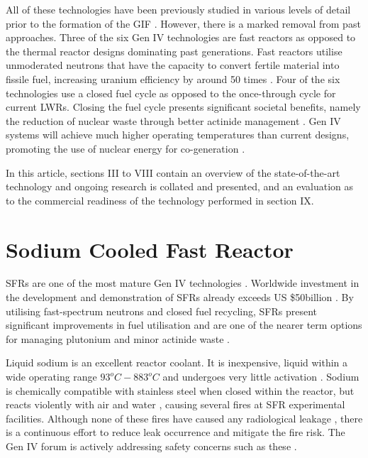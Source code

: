 \documentclass[journal]{IEEEtran}
\begin{document}
All of these technologies have been previously studied in various levels of detail prior to the formation of the GIF \cite{Marques2010a}. However, there is a marked removal from past approaches. 
Three of the six Gen IV technologies are fast reactors as opposed to the thermal reactor designs dominating past generations.
Fast reactors utilise unmoderated neutrons that have the capacity to convert fertile material into fissile fuel, increasing uranium efficiency by around 50 times \cite{Locatelli2013}. 
Four of the six technologies use a closed fuel cycle as opposed to the once-through cycle for current LWRs. 
Closing the fuel cycle presents significant societal benefits, namely the reduction of nuclear waste through better actinide management \cite{GenIVRoadmap, Bhatnagar2011}. 
Gen IV systems will achieve much  higher operating temperatures than current designs, promoting the use of nuclear energy for co-generation \cite{ Bhatnagar2011}. 

In this article, sections III to VIII contain an overview of the state-of-the-art technology and ongoing research is collated and presented, and an evaluation as to the commercial readiness of the technology performed in section IX.


\section{Sodium Cooled Fast Reactor}
SFRs are one of the most mature Gen IV technologies \cite{Marques2010a}. 
Worldwide investment in the development and demonstration of SFRs already exceeds US \$50billion \cite{Int2012}. 
By utilising fast-spectrum neutrons and closed fuel recycling, SFRs present significant improvements in fuel utilisation and are one of the nearer term options for managing plutonium and minor actinide waste \cite{GenIVForum}.

Liquid sodium is an excellent reactor coolant. 
It is inexpensive, liquid within a wide operating range $93^{o}C-883^{o}C$ and undergoes very little activation \cite{Sakamoto2013194}. 
Sodium is chemically compatible with stainless steel when closed within the reactor, but reacts violently with air and water \cite{Sakamoto2013194}, causing several fires at SFR experimental facilities.
Although none of these fires have caused any radiological leakage \cite{Int2012}, there is a continuous effort to reduce leak occurrence and mitigate the fire risk. 
The Gen IV forum is actively addressing safety concerns such as these \cite{GenIVRoadmap}.
\end{document}
